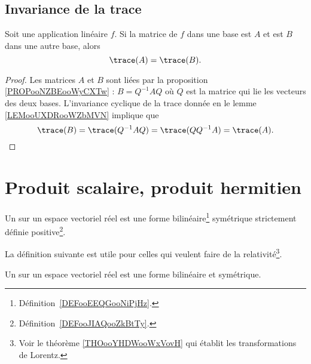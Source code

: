 \subsection{Invariance de la trace}

\begin{proposition}      \label{PROPooRMYQooWkEpJJ}
    Soit une application linéaire \( f\). Si la matrice de \( f\) dans une base est \( A\) et est \( B\) dans une autre base, alors
    \begin{equation}
        \trace(A)=\trace(B).
    \end{equation}
\end{proposition}

\begin{proof}
    Les matrices \( A\) et \( B\) sont liées par la proposition \ref{PROPooNZBEooWyCXTw} : \( B=Q^{-1}AQ\) où \( Q\) est la matrice qui lie les vecteurs des deux bases. L'invariance cyclique de la trace donnée en le lemme \ref{LEMooUXDRooWZbMVN} implique que
    \begin{equation}
        \trace(B)=\trace(Q^{-1}AQ)=\trace(QQ^{-1}A)=\trace(A).
    \end{equation}
\end{proof}

\section{Produit scalaire, produit hermitien}

\begin{definition}\label{DefVJIeTFj}
    Un  sur un espace vectoriel réel est une forme bilinéaire\footnote{Définition~\ref{DEFooEEQGooNiPjHz}.} symétrique strictement définie positive\footnote{Définition~\ref{DEFooJIAQooZkBtTy}.}.
\end{definition}

La définition suivante est utile pour celles qui veulent faire de la relativité\footnote{Voir le théorème \ref{THOooYHDWooWxVovH} qui établit les transformations de Lorentz.}.
\begin{definition}      \label{DEFooLPBGooXLxubc}
    Un  sur un espace vectoriel réel est une forme bilinéaire et symétrique.
\end{definition}

